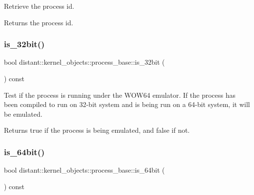 Retrieve the process id. 

\begin{DoxyReturn}{Returns}
the process id. 
\end{DoxyReturn}
\mbox{\label{classdistant_1_1kernel__objects_1_1process__base_a4c71065703937a737865428b03af8e99}} 
\subsubsection{\texorpdfstring{is\+\_\+32bit()}{is\_32bit()}}
{\footnotesize\ttfamily bool distant\+::kernel\+\_\+objects\+::process\+\_\+base\+::is\+\_\+32bit (\begin{DoxyParamCaption}{ }\end{DoxyParamCaption}) const\hspace{0.3cm}{\ttfamily [inline]}}



Test if the process is running under the W\+O\+W64 emulator. If the process has been compiled to run on 32-\/bit system and is being run on a 64-\/bit system, it will be emulated. 

\begin{DoxyReturn}{Returns}
true if the process is being emulated, and false if not. 
\end{DoxyReturn}
\mbox{\label{classdistant_1_1kernel__objects_1_1process__base_a9ac787a611e73f5347cd25a850fa0122}} 
\subsubsection{\texorpdfstring{is\+\_\+64bit()}{is\_64bit()}}
{\footnotesize\ttfamily bool distant\+::kernel\+\_\+objects\+::process\+\_\+base\+::is\+\_\+64bit (\begin{DoxyParamCaption}{ }\end{DoxyParamCaption}) const\hspace{0.3cm}{\ttfamily [inline]}}



